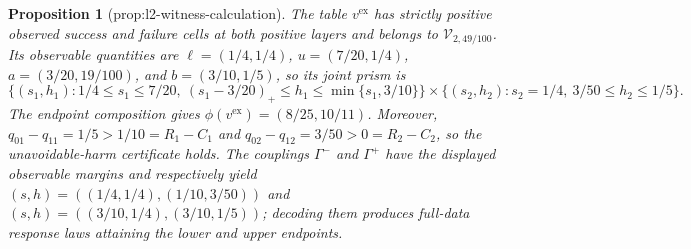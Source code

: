 \documentclass{article}
\newtheorem{proposition}{Proposition}
\begin{document}
\begin{proposition}[prop:l2-witness-calculation]\label{prop:l2-witness-calculation}
The table \(v^{\mathrm{ex}}\) has strictly positive observed success and failure cells at both positive layers and belongs to \(\mathcal V_{2,49/100}\). Its observable quantities are \(\ell=(1/4,1/4)\), \(u=(7/20,1/4)\), \(a=(3/20,19/100)\), and \(b=(3/10,1/5)\), so its joint prism is \[\{(s_1,h_1):1/4\le s_1\le7/20,\ (s_1-3/20)_+\le h_1\le\min\{s_1,3/10\}\}\times\{(s_2,h_2):s_2=1/4,\ 3/50\le h_2\le1/5\}.\] The endpoint composition gives \(\phi(v^{\mathrm{ex}})=(8/25,10/11)\). Moreover, \(q_{01}-q_{11}=1/5>1/10=R_1-C_1\) and \(q_{02}-q_{12}=3/50>0=R_2-C_2\), so the unavoidable-harm certificate holds. The couplings \(\Gamma^-\) and \(\Gamma^+\) have the displayed observable margins and respectively yield \((s,h)=((1/4,1/4),(1/10,3/50))\) and \((s,h)=((3/10,1/4),(3/10,1/5))\); decoding them produces full-data response laws attaining the lower and upper endpoints.
\end{proposition}
\end{document}
